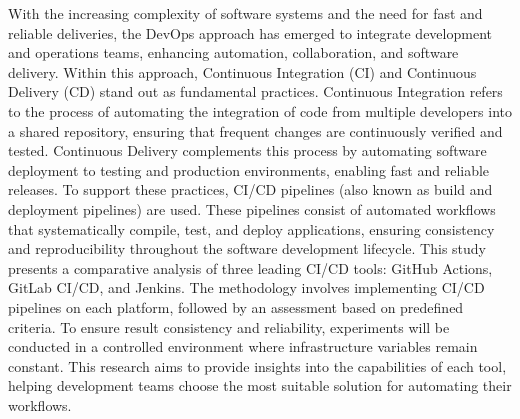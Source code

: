 
\begin{abstractutfpr}%
With the increasing complexity of software systems and the need for fast and reliable deliveries, the DevOps approach has emerged to integrate development and operations teams, enhancing automation, collaboration, and software delivery. Within this approach, Continuous Integration (CI) and Continuous Delivery (CD) stand out as fundamental practices. Continuous Integration refers to the process of automating the integration of code from multiple developers into a shared repository, ensuring that frequent changes are continuously verified and tested. Continuous Delivery complements this process by automating software deployment to testing and production environments, enabling fast and reliable releases. To support these practices, CI/CD pipelines (also known as build and deployment pipelines) are used. These pipelines consist of automated workflows that systematically compile, test, and deploy applications, ensuring consistency and reproducibility throughout the software development lifecycle.
This study presents a comparative analysis of three leading CI/CD tools: GitHub Actions, GitLab CI/CD, and Jenkins. The methodology involves implementing CI/CD pipelines on each platform, followed by an assessment based on predefined criteria. To ensure result consistency and reliability, experiments will be conducted in a controlled environment where infrastructure variables remain constant. This research aims to provide insights into the capabilities of each tool, helping development teams choose the most suitable solution for automating their workflows.
\end{abstractutfpr}
